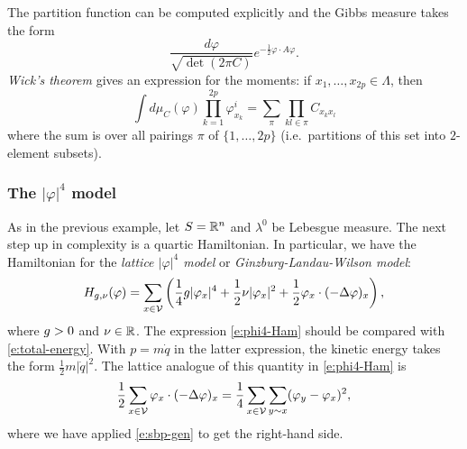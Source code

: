 The partition function can be computed explicitly and the Gibbs measure takes
the form
\begin{equation}
\label{e:gauss-density}
\frac{d\varphi}{\sqrt{\det(2\pi C)}}
e^{-\tfrac12 \varphi \cdot A \varphi}.
\end{equation}
\emph{Wick's theorem} gives an expression for the moments:
if $x_1, \ldots, x_{2p} \in \Lambda$, then
\begin{equation}
\label{e:wick}
\int d\mu_C(\varphi) \prod_{k=1}^{2p} \varphi^i_{x_k}
	=
\sum_\pi \prod_{kl\in\pi} C_{x_kx_l}
\end{equation}
where the sum is over all pairings $\pi$ of $\{1,\ldots,2p\}$ (i.e.\ partitions of
this set into $2$-element subsets).

\subsubsection{The $|\varphi|^4$ model}

As in the previous example, let $S = {\mathbb R}^n$ and $\lambda^0$ be Lebesgue measure.
The next step up in complexity is a quartic Hamiltonian. In particular, we have
the Hamiltonian for the \emph{lattice $|\varphi|^4$ model} or \emph{Ginzburg-Landau-Wilson model}:
\begin{equation}
\label{e:phi4-Ham}
H_{g,\nu}(\varphi)
  =
\sum_{x\in\mathcal{V}}
\left(
  \frac{1}{4} g |\varphi_x|^4
    +
  \frac{1}{2} \nu |\varphi_x|^2
    +
  \frac{1}{2} \varphi_x \cdot (-\Delta \varphi)_x
\right),
\end{equation}
where $g > 0$ and $\nu\in{\mathbb R}$.
The expression \eqref{e:phi4-Ham} should be compared with \eqref{e:total-energy}.
With $p = m \dot q$ in the latter expression, the kinetic energy takes the form
$\tfrac12 m |\dot q|^2$. The lattice analogue of this quantity in \eqref{e:phi4-Ham} is
\begin{equation}
\label{e:discrete-kinetic}
\frac12 \sum_{x\in\mathcal{V}} \varphi_x \cdot (-\Delta \varphi)_x
	=
\frac14 \sum_{x\in\mathcal{V}} \sum_{y\sim x} (\varphi_y - \varphi_x)^2,
\end{equation}
where we have applied \eqref{e:sbp-gen} to get the right-hand side.

